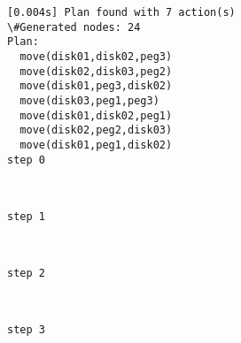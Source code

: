 \documentclass[11pt]{article}
\begin{document}
    \begin{Verbatim}[commandchars=\\\{\}]
[0.004s] Plan found with 7 action(s)
\#Generated nodes: 24
Plan:
  move(disk01,disk02,peg3)
  move(disk02,disk03,peg2)
  move(disk01,peg3,disk02)
  move(disk03,peg1,peg3)
  move(disk01,disk02,peg1)
  move(disk02,peg2,disk03)
  move(disk01,peg1,disk02)
step 0

    \end{Verbatim}

    \begin{center}
    \end{center}
    { \hspace*{\fill} \\}
    
    \begin{Verbatim}[commandchars=\\\{\}]
step 1

    \end{Verbatim}

    \begin{center}
    \end{center}
    { \hspace*{\fill} \\}
    
    \begin{Verbatim}[commandchars=\\\{\}]
step 2

    \end{Verbatim}

    \begin{center}
    \end{center}
    { \hspace*{\fill} \\}
    
    \begin{Verbatim}[commandchars=\\\{\}]
step 3

    \end{Verbatim}

    \begin{center}
    \end{center}
    { \hspace*{\fill} \\}
    
\end{document}
